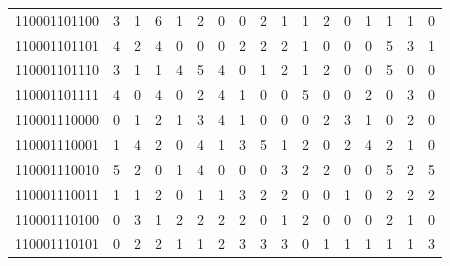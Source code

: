 \documentclass[10pt,a4paper]{article}
\begin{document}
\begin{longtable}{ |c|c|c|c|c|c|c|c|c|c|c|c|c|c|c|c|c| }
    110001101100              & 3                            & 1                                & 6                            & 1                              & 2   & 0   & 0   & 2   & 1   & 1   & 2   & 0   & 1   & 1   & 1   & 0   \\
    110001101101              & 4                            & 2                                & 4                            & 0                              & 0   & 0   & 2   & 2   & 2   & 1   & 0   & 0   & 0   & 5   & 3   & 1   \\
    110001101110              & 3                            & 1                                & 1                            & 4                              & 5   & 4   & 0   & 1   & 2   & 1   & 2   & 0   & 0   & 5   & 0   & 0   \\
    110001101111              & 4                            & 0                                & 4                            & 0                              & 2   & 4   & 1   & 0   & 0   & 5   & 0   & 0   & 2   & 0   & 3   & 0   \\
    110001110000              & 0                            & 1                                & 2                            & 1                              & 3   & 4   & 1   & 0   & 0   & 0   & 2   & 3   & 1   & 0   & 2   & 0   \\
    110001110001              & 1                            & 4                                & 2                            & 0                              & 4   & 1   & 3   & 5   & 1   & 2   & 0   & 2   & 4   & 2   & 1   & 0   \\
    110001110010              & 5                            & 2                                & 0                            & 1                              & 4   & 0   & 0   & 0   & 3   & 2   & 2   & 0   & 0   & 5   & 2   & 5   \\
    110001110011              & 1                            & 1                                & 2                            & 0                              & 1   & 1   & 3   & 2   & 2   & 0   & 0   & 1   & 0   & 2   & 2   & 2   \\
    110001110100              & 0                            & 3                                & 1                            & 2                              & 2   & 2   & 2   & 0   & 1   & 2   & 0   & 0   & 0   & 2   & 1   & 0   \\
    110001110101              & 0                            & 2                                & 2                            & 1                              & 1   & 2   & 3   & 3   & 3   & 0   & 1   & 1   & 1   & 1   & 1   & 3   \\

\end{longtable}
\end{document}
